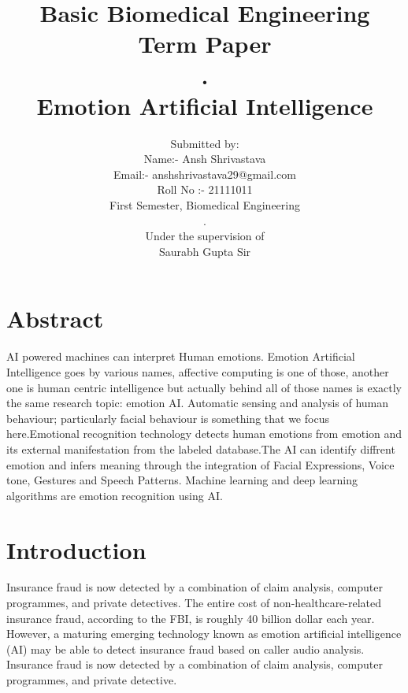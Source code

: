 \documentclass[12pt]{article}
\title{Basic Biomedical Engineering\\Term Paper\\.\\Emotion Artificial Intelligence}
\author{Submitted by: \\Name:- Ansh Shrivastava\\Email:- anshshrivastava29@gmail.com\\Roll No :- 21111011\\First Semester, Biomedical Engineering\\.\\Under the supervision of\\Saurabh Gupta Sir}
\begin{document}
\maketitle
\clearpage
\tableofcontents
\clearpage

\section{Abstract}
AI powered machines can interpret Human emotions.
Emotion Artificial Intelligence goes by various names, affective computing is one of those, another one is human centric intelligence but actually behind all of those names is exactly the same research topic: emotion AI. Automatic sensing and analysis of human behaviour; particularly facial behaviour is something that we focus here.Emotional recognition technology detects human emotions from emotion and its external manifestation from the labeled database.The AI can identify diffrent emotion and infers meaning through the integration of Facial Expressions, Voice tone, Gestures and Speech Patterns. Machine learning and deep learning algorithms are emotion recognition using AI.
\section{Introduction}
Insurance fraud is now detected by a combination of claim analysis, computer programmes, and private detectives. The entire cost of non-healthcare-related insurance fraud, according to the FBI, is roughly 40 billion dollar each year. However, a maturing emerging technology known as emotion artificial intelligence (AI) may be able to detect insurance fraud based on caller audio analysis. Insurance fraud is now detected by a combination of claim analysis, computer programmes, and private detective.
\end{document}
